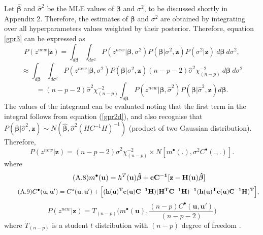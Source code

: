 Let $\boldsymbol{\hat\beta}$ and $\hat \sigma^2$ be the MLE values of $\boldsymbol{\beta}$ and $\sigma^2$, to be discussed shortly in Appendix 2.
Therefore, the estimates of $\boldsymbol\beta$ and $\sigma^2$ are obtained by integrating over all hyperparameters values weighted by their posterior.
Therefore, equation \ref{gpr3} can be expressed as
\begin{equation*}\label{gpr4}
P(z^{new}|\mathbf{z})=\int_{d\boldsymbol\beta}\int_{d\sigma^2} P(z^{new}|\boldsymbol\beta,\sigma^2)P(\boldsymbol\beta|\sigma^2,\mathbf{z}) P(\sigma^2|\mathbf{z}) ~ d\boldsymbol\beta ~d\sigma^2,
\end{equation*}
$$\approx \int_{d\boldsymbol\beta}\int_{d\sigma^2} P(z^{new}|\boldsymbol\beta,\sigma^2)P(\boldsymbol\beta|\sigma^2,\mathbf{z}) (n-p-2)\hat \sigma^2\chi_{(n-p)}^{-2} ~ d\boldsymbol\beta ~d\sigma^2$$
$$=(n-p-2)\hat \sigma^2\chi_{(n-p)}^{-2} \int_{d\boldsymbol\beta} P(z^{new}|\boldsymbol\beta,\hat \sigma^2)P(\boldsymbol\beta|\hat \sigma^2,\mathbf{z})d\boldsymbol\beta.$$
The values of the integrand can be evaluated noting that the first term in the integral follows from equation (\ref{gpr2d}), and also recognise that $P(\boldsymbol\beta|\hat \sigma^2,\mathbf{z})\sim N(\boldsymbol{\hat\beta},\hat\sigma^2 (HC^{-1}H)^{-1})$ (product of two Gaussian distribution). Therefore,
\begin{equation}\tag{A.7}\label{gpr5}
P(z^{new}|\mathbf{z})=(n-p-2)\hat \sigma^2\chi_{(n-p)}^{-2}\times N[m^{\bullet}(.),\sigma^2C^{\bullet}(.,.)].
\end{equation}
where
\begin{equation}\tag{A.8}\label{olu1}
m^{\bullet}(\mathbf{u})=h^{T}(\mathbf{u})\boldsymbol{\hat\beta}+\bf cC^{-1}[z-H(u)\boldsymbol{\hat\beta}]
\end{equation}
\begin{equation}\tag{A.9}\label{olu2}
C^{\bullet}(\mathbf{u,u'})=C^{\star}(\mathbf{u,u'})\bf+ \Big[(h(u)^T c(u)C^{-1}H)(H^TC^{-1}H)^{-1}(h(u)^T c(u)C^{-1}H)^T\Big],
\end{equation}
\begin{equation*}\label{gpr5}
P(z^{new}|\mathbf{z})=T_{(n-p)}\Big(m^{\bullet}(\mathbf{u}), \frac{(n-p)C^{\bullet}(\mathbf{u,u'})}{(n-p-2)}\Big)
\end{equation*}
where $T_{(n-p)}$ is a student $t$ distribution with $(n-p)$ degree of freedom \citep{q35,qq64,q9}.

